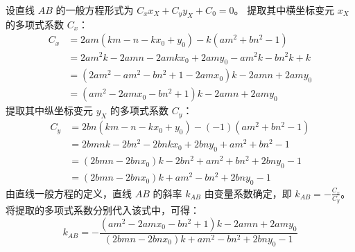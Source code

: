 \begin{solution}
设直线 $AB$ 的一般方程形式为 $C_x x_X + C_y y_X + C_0 = 0$。
提取其中横坐标变元 $x_X$ 的多项式系数 $C_x$：
\begin{align*}
C_x &= 2am(km - n - kx_0 + y_0) - k(am^2 + bn^2 - 1) \\
&= 2am^2k - 2amn - 2amkx_0 + 2amy_0 - am^2k - bn^2k + k \\
&= (2am^2 - am^2 - bn^2 + 1 - 2amx_0)k - 2amn + 2amy_0 \\
&= (am^2 - 2amx_0 - bn^2 + 1)k - 2amn + 2amy_0
\end{align*}
提取其中纵坐标变元 $y_X$ 的多项式系数 $C_y$：
\begin{align*}
C_y &= 2bn(km - n - kx_0 + y_0) - (-1)(am^2 + bn^2 - 1) \\
&= 2bmnk - 2bn^2 - 2bnkx_0 + 2bny_0 + am^2 + bn^2 - 1 \\
&= (2bmn - 2bnx_0)k - 2bn^2 + am^2 + bn^2 + 2bny_0 - 1 \\
&= (2bmn - 2bnx_0)k + am^2 - bn^2 + 2bny_0 - 1
\end{align*}
由直线一般方程的定义，直线 $AB$ 的斜率 $k_{AB}$ 由变量系数确定，即 $k_{AB} = -\frac{C_x}{C_y}$。
将提取的多项式系数分别代入该式中，可得：
\[ k_{AB} = -\frac{(am^2 - 2amx_0 - bn^2 + 1)k - 2amn + 2amy_0}{(2bmn - 2bnx_0)k + am^2 - bn^2 + 2bny_0 - 1} \]

\end{solution}

